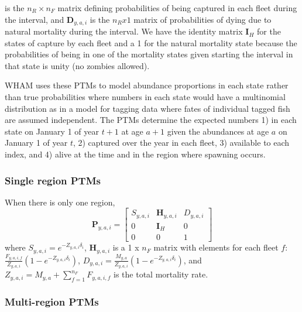 \documentclass[
]{article}
\begin{document}
is the \(n_R \times n_F\) matrix defining probabilities of being captured in each fleet during the interval, and \(\mathbf{D}_{y,a,i}\) is the \(n_R x 1\) matrix of probabilities of dying due to natural mortality during the interval. We have the identity matrix \(\mathbf{I}_{H}\) for the states of capture by each fleet and a 1 for the natural mortality state because the probabilities of being in one of the mortality states given starting the interval in that state is unity (no zombies allowed).

WHAM uses these PTMs to model abundance proportions in each state rather than true probabilities where numbers in each state would have a multinomial distribution as in a model for tagging data where fates of individual tagged fish are assumed independent. The PTMs determine the expected numbers 1) in each state on January 1 of year \(t+1\) at age \(a+1\) given the abundances at age \(a\) on January 1 of year \(t\), 2) captured over the year in each fleet, 3) available to each index, and 4) alive at the time and in the region where spawning occurs.

\hypertarget{single-region-ptms}{%
\subsubsection*{Single region PTMs}\label{single-region-ptms}}

When there is only one region,
\begin{equation}\label{eq:ptm_1_region}
\mathbf{P}_{y,a,i} = 
  \begin{bmatrix}
     S_{y,a,i} & \mathbf{H}_{y,a,i} & D_{y,a,i} \\
     0 & \mathbf{I}_{H} & 0\\
     0 & 0 & 1
  \end{bmatrix}
\end{equation}
where \(S_{y,a,i} = e^{-Z_{y,a,i}\delta_i}\), \(\mathbf{H}_{y,a,i}\) is a 1 x \(n_F\) matrix with elements for each fleet \(f\): \(\frac{F_{y,a,i,f}}{Z_{y,a,i}}\left(1 - e^{-Z_{y,a,i}\delta_i}\right)\), \(D_{y,a,i} = \frac{M_{y,a}}{Z_{y,a,i}}\left(1 - e^{-Z_{y,a,i}\delta_i}\right)\), and \(Z_{y,a,i} = M_{y,a} + \sum^{n_F}_{f=1} F_{y,a,i,f}\) is the total mortality rate.

\hypertarget{multi-region-ptms}{%
\subsubsection*{Multi-region PTMs}\label{multi-region-ptms}}
\end{document}
